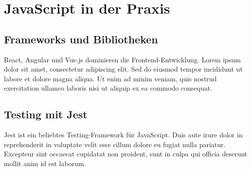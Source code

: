 \section{JavaScript in der Praxis}
\label{sec:praxis}

\subsection{Frameworks und Bibliotheken}
React, Angular und Vue.js dominieren die Frontend-Entwicklung. Lorem ipsum dolor sit amet, consectetur adipiscing elit. Sed do eiusmod tempor incididunt ut labore et dolore magna aliqua. Ut enim ad minim veniam, quis nostrud exercitation ullamco laboris nisi ut aliquip ex ea commodo consequat.

\subsection{Testing mit Jest}
Jest ist ein beliebtes Testing-Framework für JavaScript. Duis aute irure dolor in reprehenderit in voluptate velit esse cillum dolore eu fugiat nulla pariatur. Excepteur sint occaecat cupidatat non proident, sunt in culpa qui officia deserunt mollit anim id est laborum.
\parencite[12]{koch2011javascript}
